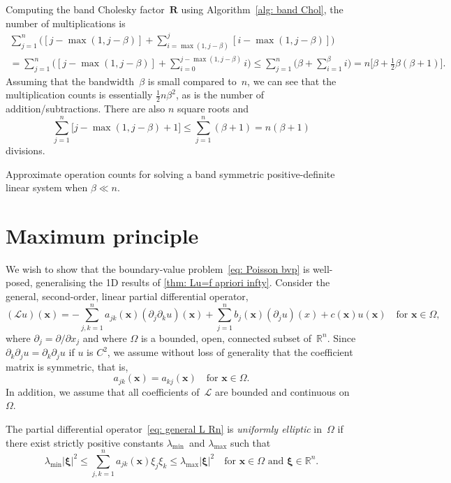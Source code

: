 Computing the band Cholesky factor~$\boldsymbol{R}$ using 
Algorithm~\ref{alg: band Chol}, the number of multiplications is
\begin{multline*}
\sum_{j=1}^n\biggl([j-\max(1,j-\beta)]
+\sum_{i=\max(1,j-\beta)}^j[i-\max(1,j-\beta)]\biggr)\\
	=\sum_{j=1}^n\biggl([j-\max(1,j-\beta)]
	+\sum_{i=0}^{j-\max(1,j-\beta)}i\biggr)
	\le\sum_{j=1}^n\biggl(\beta+\sum_{i=1}^\beta i\biggr)
	=n\bigl[\beta+\tfrac12\beta(\beta+1)\bigr].
\end{multline*}
Assuming that the bandwidth~$\beta$ is small compared to~$n$, we can see that 
the multiplication counts is essentially $\tfrac12n\beta^2$, as is the number 
of addition/subtractions.  There are also $n$ square roots and
\[
\sum_{j=1}^n\bigl[j-\max(1,j-\beta)+1]\le\sum_{j=1}^n(\beta+1)=n(\beta+1)
\]
divisions.

\begin{table}
\caption{Approximate operation counts for solving a band symmetric 
positive-definite linear system when $\beta\ll n$.}

\end{table}




\section{Maximum principle}
\newcommand{\bx}{\boldsymbol{x}}
\newcommand{\by}{\boldsymbol{y}}
We wish to show that the boundary-value problem~\eqref{eq: Poisson bvp} is
well-posed, generalising the 1D results of \cref{thm: Lu=f apriori infty}.
Consider the general, second-order, linear partial differential operator,
\begin{equation}\label{eq: general L Rn}
(\mathcal{L}u)(\bx)
	=-\sum_{j,k=1}^na_{jk}(\bx)(\partial_j\partial_ku)(\bx)
	+\sum_{j=1}^nb_j(\bx)(\partial_ju)(x)+c(\bx)u(\bx)
\quad\text{for $\bx\in\Omega$,}
\end{equation}
where $\partial_j=\partial/\partial x_j$ and where $\Omega$ is a bounded,
open, connected subset of~$\mathbb{R}^n$.  Since 
$\partial_k\partial_ju=\partial_k\partial_ju$ if $u$ is $C^2$, we assume
without loss of generality that the coefficient matrix is symmetric, that is,
\[
a_{jk}(\bx)=a_{kj}(\bx)\quad\text{for $\bx\in\Omega$.}
\]
In addition, we assume that all coefficients of~$\mathcal{L}$ are bounded
and continuous on~$\Omega$.  

\begin{definition}
The partial differential operator~\eqref{eq: general L Rn} is
\emph{uniformly elliptic} in~$\Omega$ if there exist strictly positive 
constants $\lambda_{\min}$~and $\lambda_{\max}$ such that
\[
\lambda_{\min}|\boldsymbol{\xi}|^2\le\sum_{j,k=1}^na_{jk}(\bx)\xi_j\xi_k
	\le\lambda_{\max}|\boldsymbol{\xi}|^2
\quad\text{for $\bx\in\Omega$ and $\boldsymbol{\xi}\in\mathbb{R}^n$.}
\]
\end{definition}

